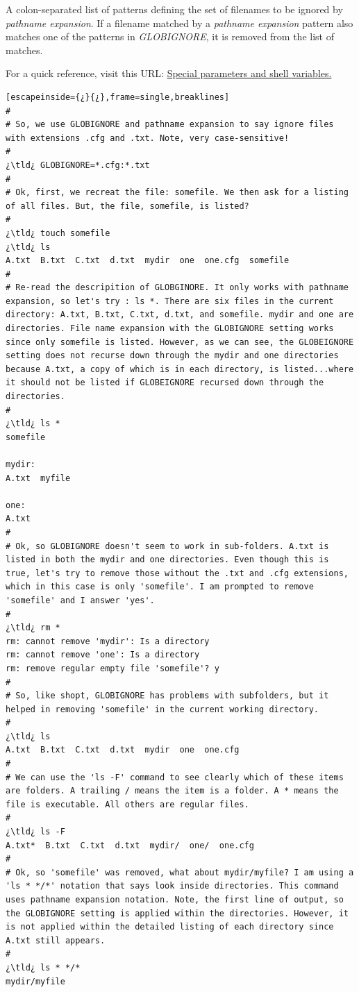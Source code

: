 \begin{addmargin}[1em]{2em}
A colon-separated list of patterns defining the set of filenames
to be ignored by \emph{pathname expansion}.  If a filename matched by a
\emph{pathname expansion}  pattern also matches one of the patterns in
\emph{GLOBIGNORE}, it is removed from the list of matches.
\end{addmargin}

For a quick reference, visit this URL: \href{http://wiki.bash-hackers.org/syntax/shellvars}{Special parameters and shell variables.}

\begin{lstlisting}[escapeinside={¿}{¿},frame=single,breaklines]
#
# So, we use GLOBIGNORE and pathname expansion to say ignore files with extensions .cfg and .txt. Note, very case-sensitive!
#
¿\tld¿ GLOBIGNORE=*.cfg:*.txt
#
# Ok, first, we recreat the file: somefile. We then ask for a listing of all files. But, the file, somefile, is listed?
#
¿\tld¿ touch somefile
¿\tld¿ ls
A.txt  B.txt  C.txt  d.txt  mydir  one  one.cfg  somefile
#
# Re-read the descripition of GLOBGINORE. It only works with pathname expansion, so let's try : ls *. There are six files in the current directory: A.txt, B.txt, C.txt, d.txt, and somefile. mydir and one are directories. File name expansion with the GLOBIGNORE setting works since only somefile is listed. However, as we can see, the GLOBEIGNORE setting does not recurse down through the mydir and one directories because A.txt, a copy of which is in each directory, is listed...where it should not be listed if GLOBEIGNORE recursed down through the directories.
#
¿\tld¿ ls *
somefile

mydir:
A.txt  myfile

one:
A.txt
#
# Ok, so GLOBIGNORE doesn't seem to work in sub-folders. A.txt is listed in both the mydir and one directories. Even though this is true, let's try to remove those without the .txt and .cfg extensions, which in this case is only 'somefile'. I am prompted to remove 'somefile' and I answer 'yes'.
#
¿\tld¿ rm *
rm: cannot remove 'mydir': Is a directory
rm: cannot remove 'one': Is a directory
rm: remove regular empty file 'somefile'? y
#
# So, like shopt, GLOBIGNORE has problems with subfolders, but it helped in removing 'somefile' in the current working directory.
#
¿\tld¿ ls
A.txt  B.txt  C.txt  d.txt  mydir  one  one.cfg
#
# We can use the 'ls -F' command to see clearly which of these items are folders. A trailing / means the item is a folder. A * means the file is executable. All others are regular files.
#
¿\tld¿ ls -F
A.txt*  B.txt  C.txt  d.txt  mydir/  one/  one.cfg
#
# Ok, so 'somefile' was removed, what about mydir/myfile? I am using a 'ls * */*' notation that says look inside directories. This command uses pathname expansion notation. Note, the first line of output, so the GLOBIGNORE setting is applied within the directories. However, it is not applied within the detailed listing of each directory since A.txt still appears.
#
¿\tld¿ ls * */*
mydir/myfile


\end{lstlisting}
